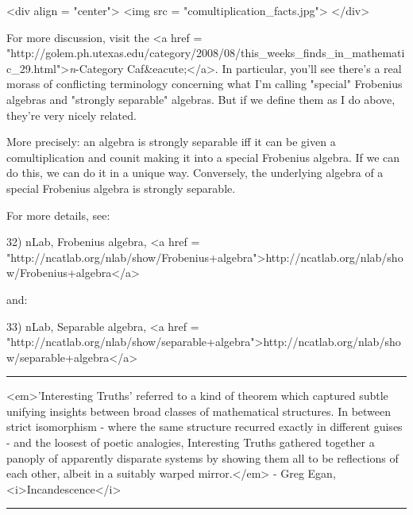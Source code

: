 <div align = "center">
<img src = "comultiplication_facts.jpg">
</div>

For more discussion, visit the 
<a href = "http://golem.ph.utexas.edu/category/2008/08/this_weeks_finds_in_mathematic_29.html">\emph{n}-Category 
Caf&eacute;</a>.  In particular, you'll see there's a real
morass of conflicting terminology concerning what I'm calling
"special" Frobenius algebras and "strongly 
separable" algebras.  But if we define them as I do above,
they're very nicely related.

More precisely: an algebra is strongly separable iff it can be given a
comultiplication and counit making it into a special Frobenius
algebra.  If we can do this, we can do it in a unique way.
Conversely, the underlying algebra of a special Frobenius algebra is
strongly separable.

For more details, see:

32) nLab, Frobenius algebra,
<a href = "http://ncatlab.org/nlab/show/Frobenius+algebra">http://ncatlab.org/nlab/show/Frobenius+algebra</a>

and: 

33) nLab, Separable algebra, <a href = "http://ncatlab.org/nlab/show/separable+algebra">http://ncatlab.org/nlab/show/separable+algebra</a>

\par\noindent\rule{\textwidth}{0.4pt}
 
<em>'Interesting Truths' referred to a kind of theorem which
captured subtle unifying insights between broad classes of
mathematical structures. In between strict isomorphism - where the
same structure recurred exactly in different guises - and the loosest
of poetic analogies, Interesting Truths gathered together a panoply of
apparently disparate systems by showing them all to be reflections of
each other, albeit in a suitably warped mirror.</em> - Greg Egan,
<i>Incandescence</i>

\par\noindent\rule{\textwidth}{0.4pt}

